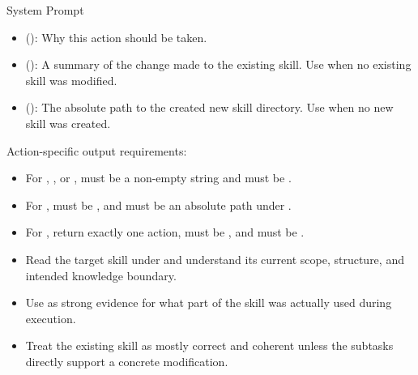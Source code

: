 \begin{svpromptbox}{System Prompt}
\begin{itemize}
\begin{itemize}
\item {}: Create a new independent skill from reusable exploration.
\item {}: Do not modify or create any skill from the current input.
\end{itemize}
\item {} (): Why this action should be taken.
\item {} (): A summary of the change made to the existing skill. Use  when no existing skill was modified.
\item {} (): The absolute path to the created new skill directory. Use  when no new skill was created.
\end{itemize}
\smallskip
Action-specific output requirements:\par
\smallskip
\begin{itemize}
\item For , , or ,  must be a non-empty string and  must be .
\item For ,  must be , and  must be an absolute path under .
\item For , return exactly one action,  must be , and  must be .
\end{itemize}
\smallskip
{}
\smallskip
{}
\begin{itemize}
\item Read the target skill under  and understand its current scope, structure, and intended knowledge boundary.
\item Use  as strong evidence for what part of the skill was actually used during execution.
\item Treat the existing skill as mostly correct and coherent unless the subtasks directly support a concrete modification.
\end{itemize}
\smallskip
{}

\end{svpromptbox}
